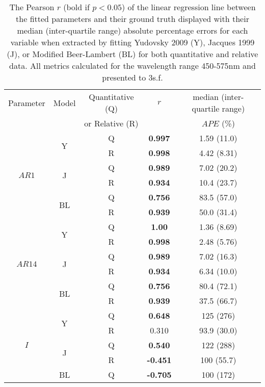 \begin{table}[htbp]
    \centering
    \caption{The  Pearson $r$ (bold if $p<0.05$) of the linear regression line between the fitted parameters and their ground
    truth displayed with their median (inter-quartile range) absolute percentage errors for each variable when extracted by fitting Yudovsky 2009 (Y), Jacques 1999 (J), or Modified Beer-Lambert (BL) for both quantitative and relative data. All metrics calculated for the wavelength range 450-575nm and presented to 3s.f.}
    \begin{tabular}{|ccc|cc|}
        \hline
        Parameter & Model & Quantitative (Q) & $r$ & median (inter-quartile range) \\
        & & or Relative (R) & & $APE$ (\%)\\
        \hline
        \multirow{6}{*}{$AR1$} & \multirow{2}{*}{Y} & Q & \textbf{0.997} & 1.59 (11.0) \\
        & & R & \textbf{0.998} & 4.42 (8.31) \\
        \cline{2-5}
        & \multirow{2}{*}{J} & Q & \textbf{0.989} & 7.02 (20.2) \\
        & & R & \textbf{0.934} & 10.4 (23.7) \\
        \cline{2-5}
        & \multirow{2}{*}{BL} & Q & \textbf{0.756} & 83.5 (57.0) \\
        & & R & \textbf{0.939} & 50.0 (31.4)\\
        \hline
        \multirow{6}{*}{$AR14$} & \multirow{2}{*}{Y} & Q & \textbf{1.00} & 1.36 (8.69) \\
        & & R & \textbf{0.998} & 2.48 (5.76) \\
        \cline{2-5}
        & \multirow{2}{*}{J} & Q & \textbf{0.989} & 7.02 (16.3) \\
        & & R & \textbf{0.934} & 6.34 (10.0)\\
        \cline{2-5}
        & \multirow{2}{*}{BL} & Q & \textbf{0.756} & 80.4 (72.1) \\
        & & R & \textbf{0.939} & 37.5 (66.7) \\
        \hline
        \multirow{6}{*}{$I$} & \multirow{2}{*}{Y} & Q & \textbf{0.648} & 125 (276) \\
        & & R & 0.310 & 93.9 (30.0) \\
        \cline{2-5}
        & \multirow{2}{*}{J} & Q & \textbf{0.540} & 122 (288) \\
        & & R & \textbf{-0.451} & 100 (55.7) \\
        \cline{2-5}
        & \multirow{2}{*}{BL} & Q & \textbf{-0.705} & 100 (172) \\

\end{tabular}
\end{table}
